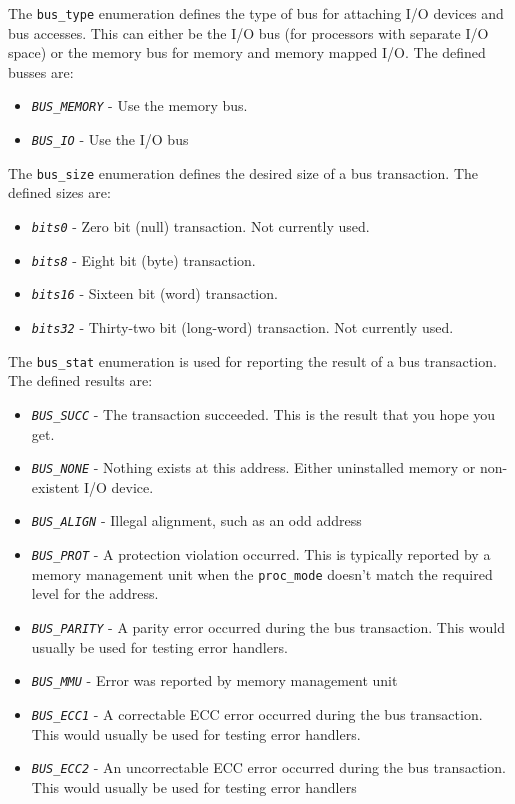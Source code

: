 \documentclass[10pt, openany]{book}
\newcommand{\constant}[1]{\emph{\texttt{#1}}}
\newcommand{\datatype}[1]{\texttt{#1}}
\begin{document}
The \datatype{bus\_type} enumeration defines the type of bus for attaching I/O devices and bus accesses.
This can either be the I/O bus (for processors with separate I/O space) or the memory bus for memory and memory mapped I/O.
The defined busses are:
\begin{itemize}
  \item \constant{BUS\_MEMORY} - Use the memory bus.
  \item \constant{BUS\_IO} - Use the I/O bus
\end{itemize}

The \datatype{bus\_size} enumeration defines the desired size of a bus transaction.
The defined sizes are:
\begin{itemize}
  \item \constant{bits0} - Zero bit (null) transaction.  Not currently used.
  \item \constant{bits8} - Eight bit (byte) transaction.
  \item \constant{bits16} - Sixteen bit (word) transaction.
  \item \constant{bits32} - Thirty-two bit (long-word) transaction.  Not currently used.
\end{itemize}

The \datatype{bus\_stat} enumeration is used for reporting the result of a bus transaction.
The defined results are:
\begin{itemize}
  \item \constant{BUS\_SUCC} - The transaction succeeded.  This is the result that you hope you get.
  \item \constant{BUS\_NONE} - Nothing exists at this address.  Either uninstalled memory or non-existent I/O device.
  \item \constant{BUS\_ALIGN} - Illegal alignment, such as an odd address
  \item \constant{BUS\_PROT} - A protection violation occurred.  This is typically reported by a memory management unit when the \datatype{proc\_mode} doesn't match the required level for the address.
  \item \constant{BUS\_PARITY} - A parity error occurred during the bus transaction.  This would usually be used for testing error handlers.
  \item \constant{BUS\_MMU} - Error was reported by memory management unit
  \item \constant{BUS\_ECC1} - A correctable ECC error occurred during the bus transaction.  This would usually be used for testing error handlers.
  \item \constant{BUS\_ECC2} - An uncorrectable ECC error occurred during the bus transaction.  This would usually be used for testing error handlers
\end{itemize}
\end{document}

